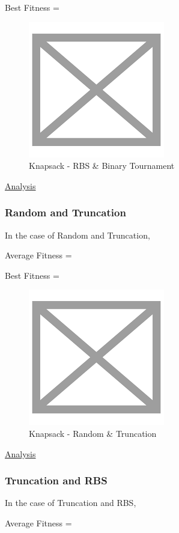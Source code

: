 \documentclass[11pt, letterpaper]{article}
\begin{document}
Best Fitness = 
\begin{figure}[H]
    \centering
    \includegraphics[scale = 0.6]{images/placeHolder.png}
    \caption {Knapsack - RBS \& Binary Tournament}
    \label {fig:kpRB}
\end{figure}

\underline{Analysis}
\subsubsection {Random and Truncation}
In the case of Random and Truncation,

Average Fitness = 

Best Fitness = 
\begin{figure}[H]
    \centering
    \includegraphics[scale = 0.6]{images/placeHolder.png}
    \caption {Knapsack - Random \& Truncation}
    \label {fig:kpRT}
\end{figure}

\underline{Analysis}
\subsubsection {Truncation and RBS}
In the case of Truncation and RBS,

Average Fitness = 
\end{document}
